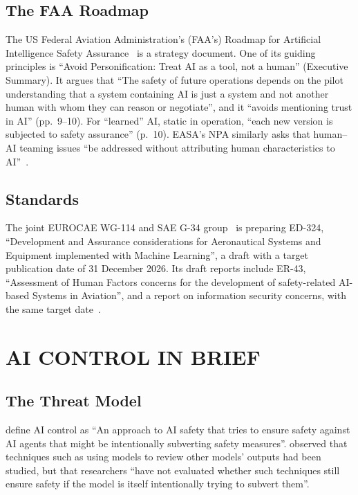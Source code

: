 \documentclass{aer}
\begin{document}
\subsection{The FAA Roadmap}\label{sec:faa}

The US Federal Aviation Administration's (FAA's) Roadmap for Artificial Intelligence Safety Assurance~\citeyearpar{faa2024roadmap} is a strategy document. One of its guiding principles is ``Avoid Personification: Treat AI as a tool, not a human'' (Executive Summary). It argues that ``The safety of future operations depends on the pilot understanding that a system containing AI is just a system and not another human with whom they can reason or negotiate'', and it ``avoids mentioning trust in AI'' (pp.~9--10). For ``learned'' AI, static in operation, ``each new version is subjected to safety assurance'' (p.~10). EASA's NPA similarly asks that human--AI teaming issues ``be addressed without attributing human characteristics to AI''~\citeyearpar[Section~2.1.1]{easa2025npaA}.

\subsection{Standards}\label{sec:standards}

The joint EUROCAE WG-114 and SAE G-34 group~\citep[Section~B]{easa2026concept} is preparing ED-324, ``Development and Assurance considerations for Aeronautical Systems and Equipment implemented with Machine Learning'', a draft with a target publication date of 31 December 2026. Its draft reports include ER-43, ``Assessment of Human Factors concerns for the development of safety-related AI-based Systems in Aviation'', and a report on information security concerns, with the same target date~\citep{eurocaewg114}.

\section{AI CONTROL IN BRIEF}\label{sec:control}

\subsection{The Threat Model}\label{sec:threatmodel}

\citet[Table~1]{korbak2025sketch} define AI control as ``An approach to AI safety that tries to ensure safety against AI agents that might be intentionally subverting safety measures''. \citet{greenblatt2023control} observed that techniques such as using models to review other models' outputs had been studied, but that researchers ``have not evaluated whether such techniques still ensure safety if the model is itself intentionally trying to subvert them''.
\end{document}
